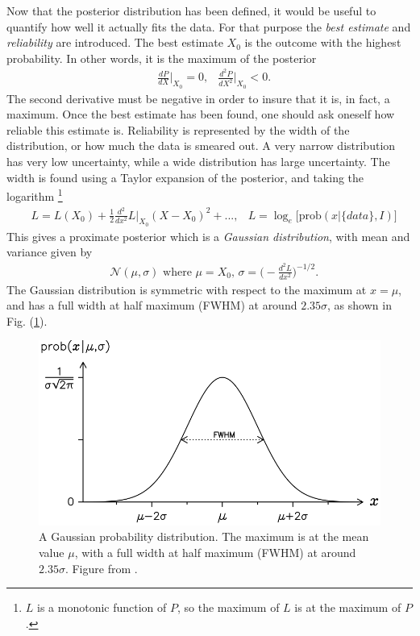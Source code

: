 \documentclass[twoside,english]{uiofysmaster}
\begin{document}
Now that the posterior distribution has been defined, it would be useful to quantify how well it actually fits the data. For that purpose the \textit{best estimate} and \textit{reliability} are introduced. The best estimate $X_0$  is the outcome with the highest probability. In other words, it is the maximum of the posterior
\begin{align}
&\frac{dP}{dX}\Big|_{X_0} = 0, &\frac{d^2P}{dX^2}\Big|_{X_0} < 0.
\end{align}
The second derivative must be negative in order to insure that it is, in fact, a maximum. Once the best estimate has been found, one should ask oneself how reliable this estimate is. Reliability is represented by the width of the distribution, or how much the data is smeared out. A very narrow distribution has very low uncertainty, while a wide distribution has large uncertainty. The width is found using a Taylor expansion of the posterior, and taking the logarithm \footnote{$L$ is a monotonic function of $P$, so the maximum of $L$ is at the maximum of $P$.}
\begin{align}
&L = L(X_0) + \frac{1}{2} \frac{d^2}{dx^2} L\Big|_{X_0} (X-X_0)^2 +... ,&L = \log_e \Big[\text{prob}(x | \{data\}, I) \Big]\label{Eq:: gaussian process : Taylor expansion L}
\end{align}
This gives a proximate posterior which is a \textit{Gaussian distribution}, with mean and variance given by
\begin{align}
&\mathcal{N}( \mu, \sigma) \text{ where } \mu = X_0\text{, } \sigma = \Big( - \frac{d^2L}{dx^2} \Big)^{-1/2}.
\end{align}
The Gaussian distribution is symmetric with respect to the maximum at $x = \mu$, and has a full width at half maximum (FWHM) at around $2.35 \sigma$, as shown in Fig. (\ref{Fig:: gaussian process : Gaussian distribution}).

\begin{figure}
\centering
\includegraphics[scale=0.5]{sivia_gaussian_distribution.png}
\caption{A Gaussian probability distribution. The maximum is at the mean value $\mu$, with a full width at half maximum (FWHM) at around $2.35 \sigma$. Figure from \cite{sivia2006data}.}
\label{Fig:: gaussian process : Gaussian distribution}
\end{figure}
\end{document}
